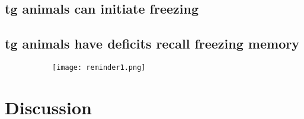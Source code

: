 \subsection{\Gls{tg} animals can initiate freezing}



\subsection{\Gls{tg} animals have deficits recall freezing memory}
\begin{figure}[h]
    \begin{subfigure}[h]{\textwidth}
        \texttt{[image: reminder1.png]}
        \caption{\label{f.ad.actf}}
    \end{subfigure}
    \caption{ \label{f.ad.reminder1}}
\end{figure}

\section{Discussion}
